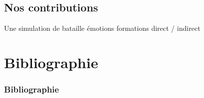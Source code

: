 \documentclass[utf8]{beamer}
\begin{document}
\subsection{Nos contributions}
\begin{frame}{Une simulation de bataille}
émotions
formations
direct / indirect
\footlineextra{}
\end{frame}


\section{Bibliographie}

%
\begin{frame}[allowframebreaks]
\frametitle{Bibliographie}

\end{frame}
\end{document}
